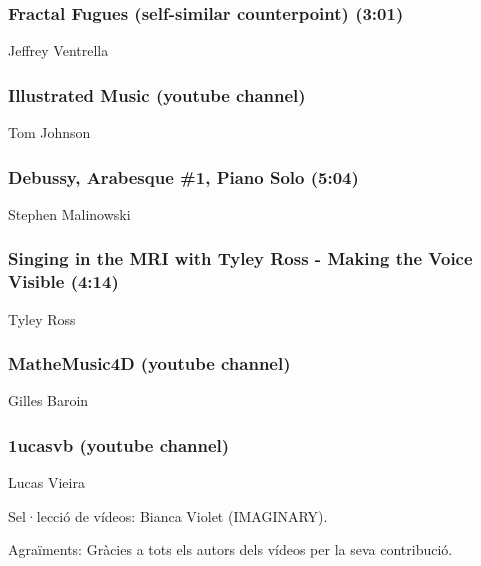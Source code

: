 \subsubsection*{Fractal Fugues (self-similar counterpoint) (3:01)}
Jeffrey Ventrella

\subsubsection*{Illustrated Music (youtube channel)}
Tom Johnson

\subsubsection*{Debussy, Arabesque \#1, Piano Solo (5:04)}
Stephen Malinowski

\subsubsection*{Singing in the MRI with Tyley Ross - Making the Voice Visible (4:14)}
Tyley Ross

\subsubsection*{MatheMusic4D (youtube channel)}
Gilles Baroin

\subsubsection*{1ucasvb (youtube channel)}
Lucas Vieira

\begin{sectcredits}
\item[Sel·lecció de vídeos:] Bianca Violet (IMAGINARY).
\item[Agraïments:] Gràcies a tots els autors dels vídeos per la seva contribució.
\end{sectcredits}
